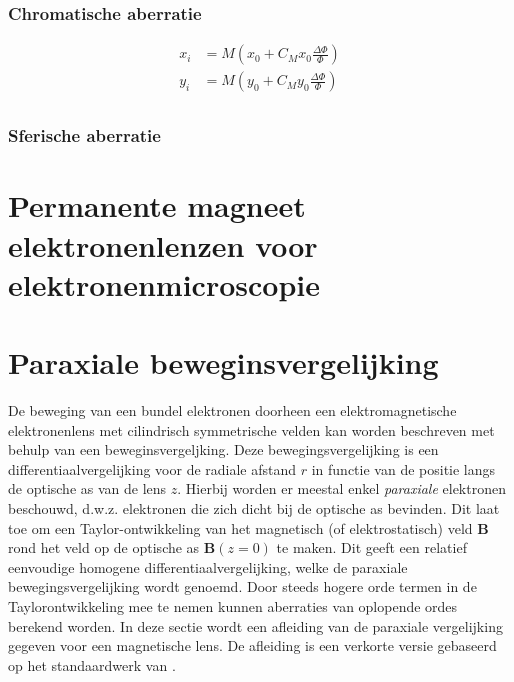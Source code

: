 \documentclass[we,twoside,openright,a4paper,11pt]{uantwerpenbamathesis}
\begin{document}
\subsubsection{Chromatische aberratie}
\begin{equation}\label{eq:chr_ab}
    \begin{split}
        x_i & = M\left(x_0+C_Mx_0\frac{\Delta\Phi}{\Phi}\right)\\
        y_i & = M\left(y_0+C_My_0\frac{\Delta\Phi}{\Phi}\right)\\
    \end{split}
\end{equation}

\subsubsection{Sferische aberratie}

\section{Permanente magneet elektronenlenzen voor elektronenmicroscopie}

\section{Paraxiale beweginsvergelijking}\label{ch:paraxialevgl}
De beweging van een bundel elektronen doorheen een elektromagnetische elektronenlens met cilindrisch symmetrische velden kan worden beschreven met behulp van een beweginsvergeljking. Deze bewegingsvergelijking is een differentiaalvergelijking voor de radiale afstand $r$ in functie van de positie langs de optische as van de lens $z$. Hierbij worden er meestal enkel \textit{paraxiale} elektronen beschouwd, d.w.z. elektronen die zich dicht bij de optische as bevinden. Dit laat toe om een Taylor-ontwikkeling van het magnetisch (of elektrostatisch) veld $\mathbf{B}$ rond het veld op de optische as $\mathbf{B}(z=0)$ te maken. Dit geeft een relatief eenvoudige homogene differentiaalvergelijking, welke de paraxiale bewegingsvergelijking wordt genoemd. Door steeds hogere orde termen in de Taylorontwikkeling mee te nemen kunnen aberraties van oplopende ordes berekend worden. In deze sectie wordt een afleiding van de paraxiale vergelijking gegeven voor een magnetische lens. De afleiding is een verkorte versie gebaseerd op het standaardwerk van \cite{PWHawkes}.\\
\end{document}
